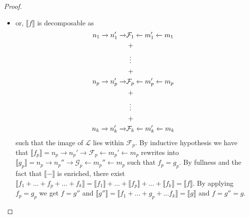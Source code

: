 \begin{proof}
\begin{itemize}
		\item or, $\llbracket f \rrbracket$ is decomposable as
		\begin{align*}
			n_1 \xrightarrow{} n_1' \xrightarrow{} &\mathcal{F}_1 \xleftarrow{} m_1' \xleftarrow{} m_1\\
			&\;+\\
			&\vdotswithin{+}\\
			&\;+\\
			n_p \xrightarrow{} n_p' \xrightarrow{} &\mathcal{F}_p \xleftarrow{} m_p' \xleftarrow{} m_p\\
			&\;+\\
			&\vdotswithin{+}\\
			&\;+\\
			n_k \xrightarrow{} n_k' \xrightarrow{} &\mathcal{F}_k \xleftarrow{} m_k' \xleftarrow{} m_k
		\end{align*}
		such that the image of $\mathcal{L}$ lies within $\mathcal{F}_{p}$.
		By inductive hypothesis we have that $\llbracket f_{p} \rrbracket = n_p \xrightarrow{} n_{p}' \xrightarrow{} \mathcal{F}_{p} \xleftarrow{} m_{p}' \xleftarrow{} m_{p}$ rewrites into $\llbracket g_{p} \rrbracket = n_p \xrightarrow{} n_{p}'' \xrightarrow{} \mathcal{G}_{p} \xleftarrow{} m_{p}'' \xleftarrow{} m_{p}$ such that $f_{p} = g_{p}$.
		By fullness and the fact that $\llbracket - \rrbracket$ is enriched, there exist $\llbracket f_1 + \ldots + f_{p} + \ldots + f_{k} \rrbracket = \llbracket f_{1} \rrbracket + \ldots + \llbracket f_{p} \rrbracket + \ldots + \llbracket f_{k} \rrbracket = \llbracket f \rrbracket$.
		By applying $f_{p} = g_{p}$ we get $f = g''$ and $\llbracket g'' \rrbracket = \llbracket f_{1} + \ldots + g_{p} + \ldots f_{k} \rrbracket = \llbracket g \rrbracket$ and $f = g'' = g$.
\end{itemize}


\end{proof}
